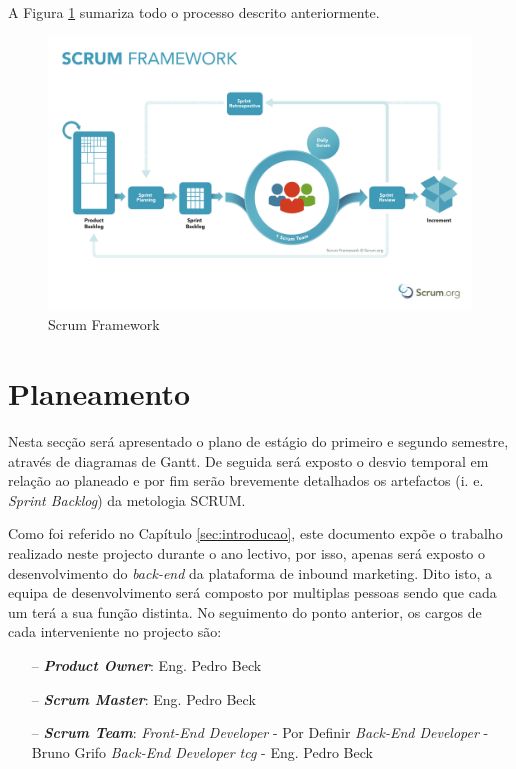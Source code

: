 A Figura \ref{fig:scrum} sumariza todo o processo descrito anteriormente.



\begin{figure}[ht!]
	\begin{center}
		\includegraphics[width=1\textwidth]{img/scrum.pdf}
		\caption{Scrum Framework\cite{scrumimg}}
		\label{fig:scrum}
	\end{center}
\end{figure}

\newpage

\section{Planeamento}
\label{planeamento}

Nesta secção será apresentado o plano de estágio do primeiro e segundo semestre, através de diagramas de Gantt.  De seguida será exposto o desvio temporal em relação ao planeado e por fim serão brevemente detalhados os artefactos (i. e. \textit{Sprint Backlog}) da metologia SCRUM.

Como foi referido no Capítulo \ref{sec:introducao}, este documento expõe o trabalho realizado neste projecto durante o ano lectivo, por isso, apenas será exposto o desenvolvimento do \textit{back-end} da plataforma de inbound marketing. Dito isto, a equipa de desenvolvimento será composto por multiplas pessoas sendo que cada um terá a sua função distinta.
No seguimento do ponto anterior, os cargos de cada interveniente no projecto são:
\begin{itemize}
	\item[--] \textbf{\textit{Product Owner}}: Eng. Pedro Beck
	\item[--] \textbf{\textit{Scrum Master}}: Eng. Pedro Beck
	\item[--] \textbf{\textit{Scrum Team}}: 
	\subitem  \textit{Front-End Developer} - Por Definir
	\subitem  \textit{Back-End Developer} - Bruno Grifo
	\subitem  \textit{Back-End Developer \acrshort{tcg}} - Eng. Pedro Beck
\end{itemize}

